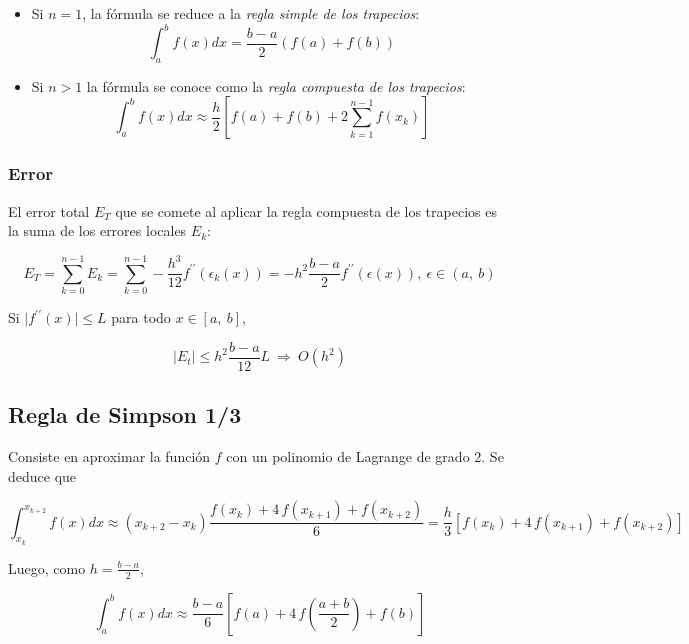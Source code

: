 \documentclass{article}
\begin{document}
\begin{itemize}
    \item Si $n = 1$, la fórmula se reduce a la \emph{regla simple de los
    trapecios}:
    \[ \int_{a}^{b} f(x)dx = \frac{b-a}{2}(f(a) + f(b))\]

    \item Si $n>1$ la fórmula se conoce como la \emph{regla compuesta de los
    trapecios}:
    \[ 
        \int_{a}^{b} f(x)dx 
        \approx \frac{h}{2}\left[ f(a) + f(b) 
        + 2 \sum_{k=1}^{n-1} f(x_k)\right]
    \]
\end{itemize}

\subsubsection{Error}

El error total $E_T$ que se comete al aplicar la regla compuesta de los 
trapecios es la suma de los errores locales $E_k$:

\begin{equation*}
E_T = \sum_{k=0}^{n-1} E_k 
= \sum_{k=0}^{n-1} - \frac{h^3}{12} f^{\prime\prime}\left(\epsilon_k(x)\right)
= -h^2 \frac{b-a}{2} f^{\prime\prime} \left( \epsilon(x)\right),\ 
\epsilon\in (a,\ b)
\end{equation*}

Si $\vert f^{\prime\prime}(x) \vert \leq L$ para todo $x\in[a,\ b]$,

\begin{equation*}
\vert E_t\vert \leq h^2 \frac{b-a}{12}L\ \Rightarrow\ O(h^2)
\end{equation*}

\subsection{Regla de Simpson 1/3}

Consiste en aproximar la función $f$ con un polinomio de Lagrange de grado 2.
Se deduce que

\begin{equation*}
\int_{x_k}^{x_{k+2}} f(x)dx 
\approx (x_{k+2} - x_k) \frac{f(x_k) + 4\,f(x_{k+1}) + f(x_{k+2})}{6}
= \frac{h}{3} \left[ f(x_k) + 4\,f(x_{k+1}) + f(x_{k+2})\right]
\end{equation*}

Luego, como $h = \frac{b-a}{2}$,

\begin{equation*}
\int_{a}^{b} f(x)dx
\approx \frac{b-a}{6} \left[ f(a) + 4\,f\left(\frac{a+b}{2}\right) + f(b)\right]
\end{equation*}
\end{document}

